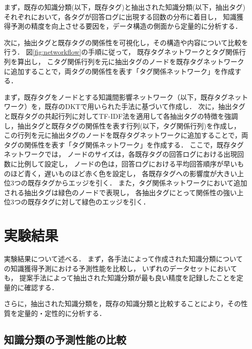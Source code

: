 まず，既存の知識分類(以下，既存タグ)と抽出された知識分類(以下，抽出タグ)それぞれにおいて，各タグが回答ログに出現する回数の分布に着目し，
知識獲得予測の精度を向上させる要因を，データ構造の側面から定量的に分析する．

次に，抽出タグと既存タグの関係性を可視化し，その構造や内容について比較を行う．
図\ref{fig:networkflow}の手順に従って，
既存タグネットワークとタグ関係行列を算出し，
こタグ関係行列を元に抽出タグのノードを既存タグネットワークに追加することで，両タグの関係性を表す「タグ関係ネットワーク」を作成する．

まず，既存タグをノードとする知識間影響ネットワーク（以下，既存タグネットワーク）を，既存のDKTで用いられた手法に基づいて作成し．
次に，抽出タグと既存タグの共起行列に対してTF-IDF法を適用して各抽出タグの特徴を強調し，抽出タグと既存タグの関係性を表す行列(以下，タグ関係行列)を作成し，
この行列を元に抽出タグのノードを既存タグネットワークに追加することで，両タグの関係性を表す「タグ関係ネットワーク」を作成する．
ここで，既存タグネットワークでは，
ノードのサイズは，各既存タグの回答ログにおける出現回数に比例して設定し，
ノードの色は，回答ログにおける平均回答順序が早いものほど青く，遅いものほど赤く色を設定し，
各既存タグへの影響度が大きい上位3つの既存タグからエッジを引く．
また，タグ関係ネットワークにおいて追加される抽出タグは緑色のノードで表現し，
各抽出タグにとって関係性の強い上位3つの既存タグに対して緑色のエッジを引く．




\section{実験結果}
実験結果について述べる．
まず，各手法によって作成された知識分類についての知識獲得予測における予測性能を比較し，
いずれのデータセットにおいても，
提案手法によって抽出された知識分類が最も良い精度を記録したことを定量的に確認する．

さらに，抽出された知識分類を，既存の知識分類と比較することにより，その性質を定量的・定性的に分析する．



\subsection{知識分類の予測性能の比較}

